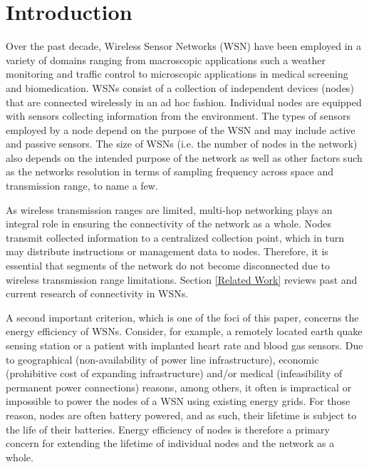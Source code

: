 \section{Introduction}

Over the past decade, Wireless Sensor Networks (WSN) have been employed in a variety of domains ranging from macroscopic applications such a weather monitoring and traffic control to microscopic applications in medical screening and biomedication. WSNs consist of a collection of independent devices (nodes) that are connected wirelessly in an ad hoc fashion. Individual nodes are equipped with sensors collecting information from the environment. The types of sensors employed by a node depend on the purpose of the WSN and may include active and passive sensors. The size of WSNs (i.e. the number of nodes in the network) also depends on the intended purpose of the network as well as other factors such as the networks resolution in terms of sampling frequency across space and transmission range, to name a few.

As wireless transmission ranges are limited, multi-hop networking plays an integral role in ensuring the connectivity of the network as a whole. Nodes transmit collected information to a centralized collection point, which in turn may distribute instructions or management data to nodes. Therefore, it is essential that segments of the network do not become disconnected due to wireless transmission range limitations. Section \ref{Related Work} reviews past and current research of connectivity in WSNs.

A second important criterion, which is one of the foci of this paper, concerns the energy efficiency of WSNs. Consider, for example, a remotely located earth quake sensing station or a patient with implanted heart rate and blood gas sensors. Due to geographical (non-availability of power line infrastructure), economic (prohibitive cost of expanding infrastructure) and/or medical (infeasibility of permanent power connections) reasons, among others, it often is impractical or impossible to power the nodes of a WSN using existing energy grids. For those reason, nodes are often battery powered, and as such, their lifetime is subject to the life of their batteries. Energy efficiency of nodes is therefore a primary concern for extending the lifetime of individual nodes and the network as a whole.

